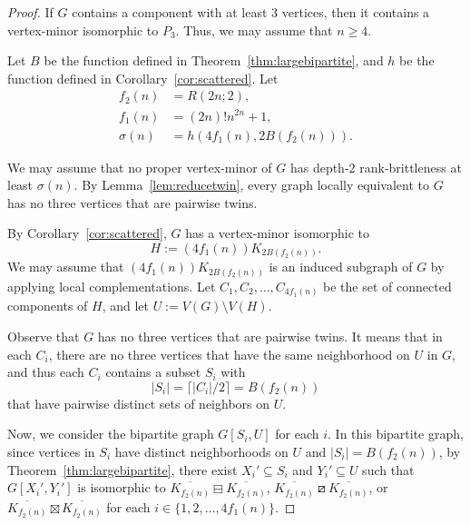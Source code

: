 \documentclass[11pt]{article}
\newcommand\abs[1]{\lvert #1\rvert}
\newcommand\mat{\boxminus}
\newcommand\tri{\boxslash}
\newcommand\antimat{\boxtimes}
\def\S_#1{\overline{K_{#1}}}
\begin{document}
		\begin{proof}
		If $G$ contains a component with at least $3$ vertices, then it contains a vertex-minor isomorphic to $P_3$.
		Thus, we may assume that $n\ge 4$.
		
		Let $B$ be the function defined in Theorem~\ref{thm:largebipartite}, 
                and $h$ be the function defined in Corollary~\ref{cor:scattered}.
                Let
                \begin{align*}
                  f_2(n)&=R(2n;2),\\
		 f_1(n)&= (2n)! n^{2n}+1 , \\
		 \sigma(n)&=h(4f_1(n),2B(f_2(n))).
                \end{align*}


                We may assume that no proper vertex-minor of $G$
                has depth-$2$ rank-brittleness at least $\sigma(n)$.
		By Lemma~\ref{lem:reducetwin},
                every graph locally equivalent to $G$ has no three vertices that are pairwise twins.
		
                By Corollary~\ref{cor:scattered}, 
                $G$ has a vertex-minor isomorphic to 
                \[H:=(4f_1(n)) K_{2B(f_2(n))}.\]
                We may assume that
                $(4f_1(n)) K_{2B(f_2(n))}$ is an induced subgraph of $G$
                by applying local complementations.
		Let $C_1, C_2, \ldots, C_{4f_1(n)}$ be the set of connected components of $H$, and let $U:=V(G)\setminus V(H)$.
		
		Observe that 
		$G$ has no three vertices that are pairwise twins.
		It means that in each $C_i$, there are no three vertices that have the same neighborhood on $U$ in $G$, and 
		thus each $C_i$ contains a subset $S_i$ with  \[\abs{S_i}=\lceil {\abs{C_i}}/2\rceil=B( f_2(n) )\] that have pairwise distinct
                sets of neighbors on $U$.

%
		
		Now, we consider the bipartite graph $G[S_i, U]$ for each $i$. 
		In this bipartite graph, since vertices in $S_i$ have distinct neighborhoods on $U$ and $\abs{S_i}=B( f_2(n) )$, 
		by Theorem~\ref{thm:largebipartite}, 
		there exist $X_i'\subseteq S_i$ and $Y_i'\subseteq U$ such that
		$G[X_i', Y_i']$ is isomorphic to $\S_{f_2(n)}\mat\S_{f_2(n)}$, $\S_{f_2(n)}\tri \S_{f_2(n)}$, or
                $\S_{f_2(n)}\antimat\S_{f_2(n)}$
                for each $i\in\{1,2,\ldots,4f_1(n)\}$.
      


\end{proof}
\end{document}
